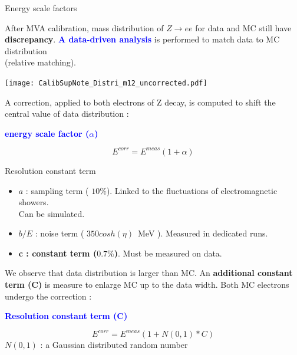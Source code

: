 \begin{frame}{Energy scale factors}
  \begin{minipage}{0.49\linewidth}
    After MVA calibration, mass distribution of $Z\rightarrow ee$ for data and MC still have \\{\bf discrepancy}.
    \newline
    \textcolor{blue}{\bf A data-driven analysis } is performed to match data to MC distribution \\(relative matching).
  \end{minipage}
  \hfill
  \begin{minipage}{0.49\linewidth}
    \texttt{[image: CalibSupNote\_Distri\_m12\_uncorrected.pdf]}
  \end{minipage}

A correction, applied to both electrons of Z decay, is computed to shift the central value of data distribution : 
\begin{center} \textcolor{blue}{\bf energy scale factor ($\alpha$)} \end{center}
$$E^{corr}=E^{meas}(1+\alpha)$$
\end{frame}

\begin{frame}{Resolution constant term}
  
  \begin{itemize}
  \item $a$ : sampling term ( $10\%$). Linked to the fluctuations of electromagnetic showers. \\Can be simulated.
  \item $b/E$ : noise term ( $350cosh(\eta )$~MeV ). Measured in dedicated runs.
  \item {\bf c : constant term ($0.7\%$)}. Must be measured on data.
  \end{itemize}
  We observe that data distribution is larger than MC. 
  An {\bf additional constant term (C)} is measure to enlarge MC up to the data width.
  Both MC electrons undergo the correction :
  \begin{center}\textcolor{blue}{\bf Resolution constant term (C) }\end{center}
  $$E^{corr} = E^{meas}(1+N(0,1)*C)$$
  $N(0,1)$ : a Gaussian distributed random number
\end{frame}

